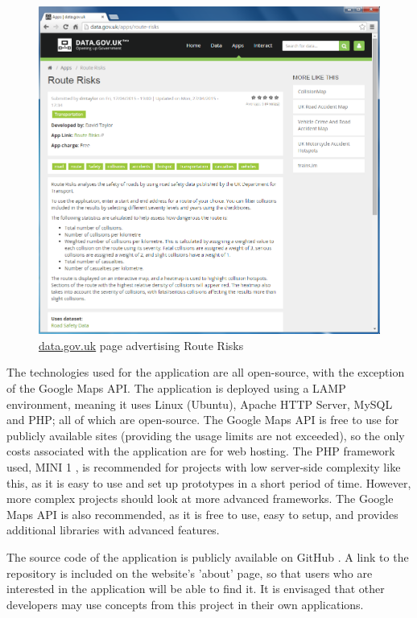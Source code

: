 \documentclass[authoryearcitations]{UoYCSproject}
\begin{document}
\begin{figure}
	\center
	\includegraphics[scale=0.4]{datagovuk}
	\caption{\url{data.gov.uk} page advertising Route Risks}
	\label{fig:datagovuk}
\end{figure}

The technologies used for the application are all open-source, with the exception of the Google Maps API. The application is deployed using a LAMP environment, meaning it uses Linux (Ubuntu), Apache HTTP Server, MySQL and PHP; all of which are open-source. The Google Maps API is free to use for publicly available sites (providing the usage limits are not exceeded), so the only costs associated with the application are for web hosting. The PHP framework used, MINI 1 \citep{mini}, is recommended for projects with low server-side complexity like this, as it is easy to use and set up prototypes in a short period of time. However, more complex projects should look at more advanced frameworks. The Google Maps API is also recommended, as it is free to use, easy to setup, and provides additional libraries with advanced features.

The source code of the application is publicly available on GitHub \citep{Taylor2015}. A link to the repository is included on the website's 'about' page, so that users who are interested in the application will be able to find it. It is envisaged that other developers may use concepts from this project in their own applications.
\end{document}
